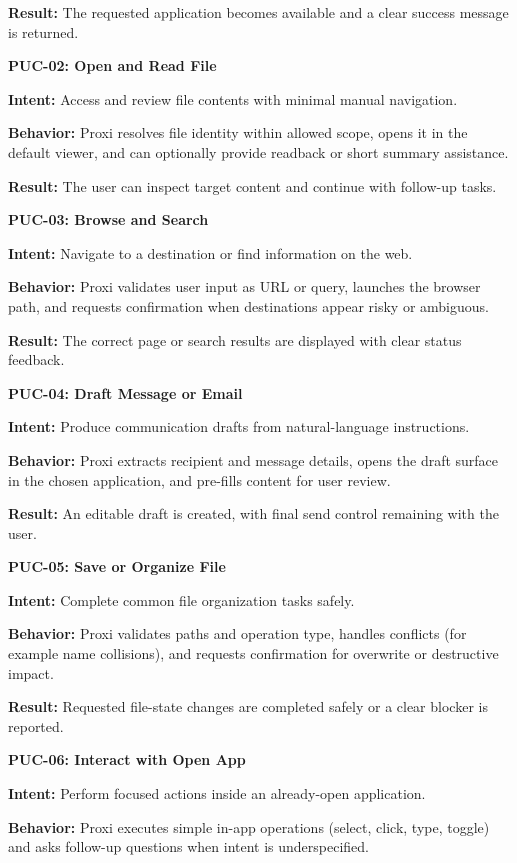 \documentclass[12pt]{article}
\begin{document}
\textbf{Result:} The requested application becomes available and a
clear success message is returned.

\medskip
\noindent\textbf{PUC-02: Open and Read File}

\textbf{Intent:} Access and review file contents with minimal manual
navigation.

\textbf{Behavior:} Proxi resolves file identity within allowed scope,
opens it in the default viewer, and can optionally provide readback or
short summary assistance.

\textbf{Result:} The user can inspect target content and continue with
follow-up tasks.

\medskip
\noindent\textbf{PUC-03: Browse and Search}

\textbf{Intent:} Navigate to a destination or find information on the
web.

\textbf{Behavior:} Proxi validates user input as URL or query, launches
the browser path, and requests confirmation when destinations appear
risky or ambiguous.

\textbf{Result:} The correct page or search results are displayed with
clear status feedback.

\medskip
\noindent\textbf{PUC-04: Draft Message or Email}

\textbf{Intent:} Produce communication drafts from natural-language
instructions.

\textbf{Behavior:} Proxi extracts recipient and message details, opens
the draft surface in the chosen application, and pre-fills content for
user review.

\textbf{Result:} An editable draft is created, with final send control
remaining with the user.

\medskip
\noindent\textbf{PUC-05: Save or Organize File}

\textbf{Intent:} Complete common file organization tasks safely.

\textbf{Behavior:} Proxi validates paths and operation type, handles
conflicts (for example name collisions), and requests confirmation for
overwrite or destructive impact.

\textbf{Result:} Requested file-state changes are completed safely or a
clear blocker is reported.

\medskip
\noindent\textbf{PUC-06: Interact with Open App}

\textbf{Intent:} Perform focused actions inside an already-open
application.

\textbf{Behavior:} Proxi executes simple in-app operations (select,
click, type, toggle) and asks follow-up questions when intent is
underspecified.
\end{document}
